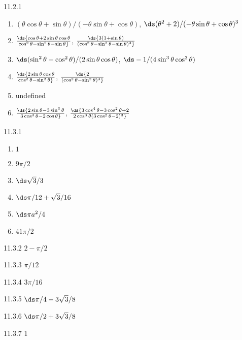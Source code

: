 \begin{Answer}{11.2.1}
\begin{enumerate}
	\item	$(\theta\cos\theta+\sin\theta)/(-\theta\sin\theta+\cos\theta)$,
	$\ds (\theta^2+2)/(-\theta\sin\theta+\cos\theta)^3$
	\item	$\ds {\cos\theta+2\sin\theta\cos\theta\over
		\cos^2\theta-\sin^2\theta-\sin\theta}$,
	$\ds {3(1+\sin\theta)\over(\cos^2\theta-\sin^2\theta-\sin\theta)^3}$
	\item	$\ds (\sin^2\theta-\cos^2\theta)/(2\sin\theta\cos\theta)$,
	$\ds -1/(4\sin^3\theta\cos^3\theta)$
	\item	$\ds {2\sin\theta\cos\theta\over\cos^2\theta-\sin^2\theta}$,
	$\ds {2\over(\cos^2\theta-\sin^2\theta)^3}$
	\item	undefined
	\item	$\ds {2\sin\theta-3\sin^3\theta\over3\cos^3\theta-2\cos\theta}$,
	$\ds {3\cos^4\theta-3\cos^2\theta+2\over2\cos^3\theta(3\cos^2\theta-2)^3}$
\end{enumerate}
\end{Answer}
\begin{Answer}{11.3.1}
\begin{multicols}{2}
\begin{enumerate}
	\item	$1$
	\item	$9\pi/2$
	\item	$\ds \sqrt3/3$
	\item	$\ds \pi/12+\sqrt3/16$
	\item	$\ds \pi a^2/4$
	\item	$41\pi/2$
\end{enumerate}
\end{multicols}
\end{Answer}
\begin{Answer}{11.3.2}
 $2-\pi/2$
\end{Answer}
\begin{Answer}{11.3.3}
 $\pi/12$
\end{Answer}
\begin{Answer}{11.3.4}
 $3\pi/16$
\end{Answer}
\begin{Answer}{11.3.5}
 $\ds \pi/4-3\sqrt3/8$
\end{Answer}
\begin{Answer}{11.3.6}
 $\ds \pi/2+3\sqrt3/8$
\end{Answer}
\begin{Answer}{11.3.7}
 $1$
\end{Answer}
